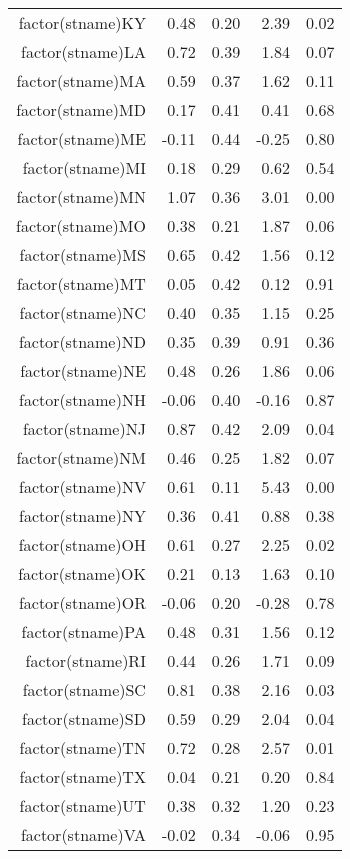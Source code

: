\begin{table}[ht]
\begin{tabular}{rrrrr}
  factor(stname)KY & 0.48 & 0.20 & 2.39 & 0.02 \\ 
  factor(stname)LA & 0.72 & 0.39 & 1.84 & 0.07 \\ 
  factor(stname)MA & 0.59 & 0.37 & 1.62 & 0.11 \\ 
  factor(stname)MD & 0.17 & 0.41 & 0.41 & 0.68 \\ 
  factor(stname)ME & -0.11 & 0.44 & -0.25 & 0.80 \\ 
  factor(stname)MI & 0.18 & 0.29 & 0.62 & 0.54 \\ 
  factor(stname)MN & 1.07 & 0.36 & 3.01 & 0.00 \\ 
  factor(stname)MO & 0.38 & 0.21 & 1.87 & 0.06 \\ 
  factor(stname)MS & 0.65 & 0.42 & 1.56 & 0.12 \\ 
  factor(stname)MT & 0.05 & 0.42 & 0.12 & 0.91 \\ 
  factor(stname)NC & 0.40 & 0.35 & 1.15 & 0.25 \\ 
  factor(stname)ND & 0.35 & 0.39 & 0.91 & 0.36 \\ 
  factor(stname)NE & 0.48 & 0.26 & 1.86 & 0.06 \\ 
  factor(stname)NH & -0.06 & 0.40 & -0.16 & 0.87 \\ 
  factor(stname)NJ & 0.87 & 0.42 & 2.09 & 0.04 \\ 
  factor(stname)NM & 0.46 & 0.25 & 1.82 & 0.07 \\ 
  factor(stname)NV & 0.61 & 0.11 & 5.43 & 0.00 \\ 
  factor(stname)NY & 0.36 & 0.41 & 0.88 & 0.38 \\ 
  factor(stname)OH & 0.61 & 0.27 & 2.25 & 0.02 \\ 
  factor(stname)OK & 0.21 & 0.13 & 1.63 & 0.10 \\ 
  factor(stname)OR & -0.06 & 0.20 & -0.28 & 0.78 \\ 
  factor(stname)PA & 0.48 & 0.31 & 1.56 & 0.12 \\ 
  factor(stname)RI & 0.44 & 0.26 & 1.71 & 0.09 \\ 
  factor(stname)SC & 0.81 & 0.38 & 2.16 & 0.03 \\ 
  factor(stname)SD & 0.59 & 0.29 & 2.04 & 0.04 \\ 
  factor(stname)TN & 0.72 & 0.28 & 2.57 & 0.01 \\ 
  factor(stname)TX & 0.04 & 0.21 & 0.20 & 0.84 \\ 
  factor(stname)UT & 0.38 & 0.32 & 1.20 & 0.23 \\ 
  factor(stname)VA & -0.02 & 0.34 & -0.06 & 0.95 \\ 

\end{tabular}
\end{table}
